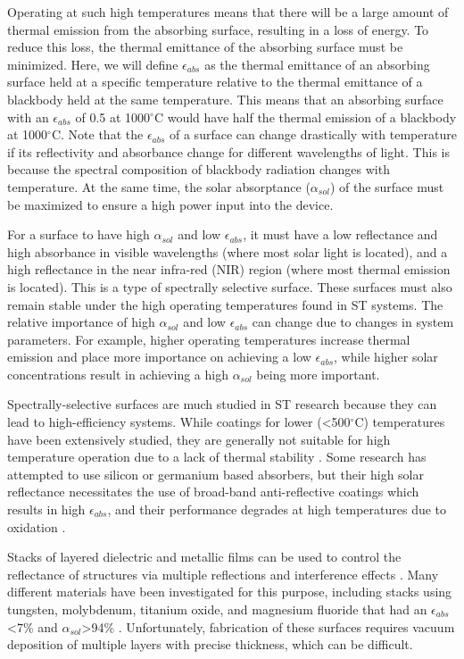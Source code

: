 \documentclass[10pt,letterpaper]{article}
\begin{document}
Operating at such high temperatures means that there will be a large amount of thermal emission from the absorbing surface, resulting in a loss of energy.  To reduce this loss, the thermal emittance of the absorbing surface must be minimized.  Here, we will define $\epsilon_{abs}$ as the thermal emittance of an absorbing surface held at a specific temperature relative to the thermal emittance of a blackbody held at the same temperature.  This means that an absorbing surface with an $\epsilon_{abs}$ of 0.5 at 1000$^\circ$C would have half the thermal emission of a blackbody at 1000$^\circ$C.  Note that the $\epsilon_{abs}$ of a surface can change drastically with temperature if its reflectivity and absorbance change for different wavelengths of light.  This is because the spectral composition of blackbody radiation changes with temperature.  At the same time, the solar absorptance ($\alpha_{sol}$) of the surface must be maximized to ensure a high power input into the device.

For a surface to have high $\alpha_{sol}$ and low $\epsilon_{abs}$, it must have a low reflectance and high absorbance in visible wavelengths (where most solar light is located), and a high reflectance in the near infra-red (NIR) region (where most thermal emission is located).  This is a type of spectrally selective surface.  These surfaces must also remain stable under the high operating temperatures found in ST systems.  The relative importance of high $\alpha_{sol}$ and low $\epsilon_{abs}$ can change due to changes in system parameters.  For example, higher operating temperatures increase thermal emission and place more importance on achieving a low $\epsilon_{abs}$, while higher solar concentrations result in achieving a high $\alpha_{sol}$ being more important.

Spectrally-selective surfaces are much studied in ST research 
because they can lead to high-efficiency systems.  While coatings for lower (\textless500$^\circ$C) temperatures have been extensively studied, they are generally not suitable for high temperature operation due to a lack of thermal stability \cite{A1}.  Some research has attempted to use silicon or germanium based absorbers, but their high solar reflectance necessitates the use of broad-band anti-reflective coatings which results in high $\epsilon_{abs}$, and their performance degrades at high temperatures due to oxidation \cite{A2}. 

Stacks of layered dielectric and metallic films can be used to control the reflectance of structures via multiple reflections and interference effects \cite{A3}.  Many different materials have been investigated for this purpose, including stacks using tungsten, molybdenum, titanium oxide, and magnesium fluoride that had an $\epsilon_{abs}$\textless7\% and $\alpha_{sol}$\textgreater94\% \cite{paper1_ref7,stacks2, A2}.  Unfortunately, fabrication of these surfaces requires vacuum deposition of multiple layers with precise thickness, which can be difficult.
\end{document}
